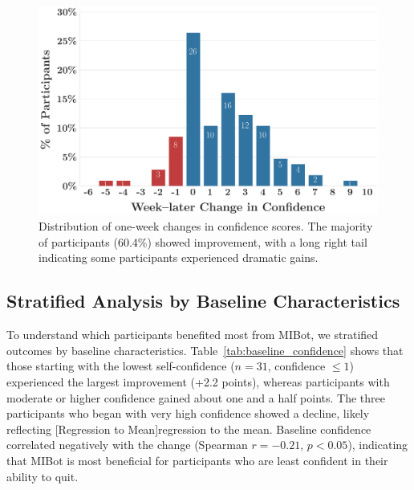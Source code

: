 \begin{figure}[ht]
  \centering
  \includegraphics[width=0.8\linewidth]{fig/2024-11-14-MIV6.3A-2024-11-22-MIV6.3A_ruler_deltas_delta_with_week_later_keep_high_conf_False_change.png}
  \caption{Distribution of one-week changes in confidence scores. The majority of participants (60.4\%) showed improvement, with a long right tail indicating some participants experienced dramatic gains.}
  \label{fig:confidence_change_distribution}
\end{figure}



\subsection{Stratified Analysis by Baseline Characteristics}

To understand which participants benefited most from MIBot, we stratified outcomes by baseline characteristics. Table~\ref{tab:baseline_confidence} shows that those starting with the lowest self-confidence ($n=31$, confidence $\leq 1$) experienced the largest improvement (+2.2 points), whereas participants with moderate or higher confidence gained about one and a half points. The three participants who began with very high confidence showed a decline, likely reflecting [Regression to Mean]regression to the mean. Baseline confidence correlated negatively with the change (Spearman $r=-0.21$, $p<0.05$), indicating that MIBot is most beneficial for participants who are least confident in their ability to quit.

